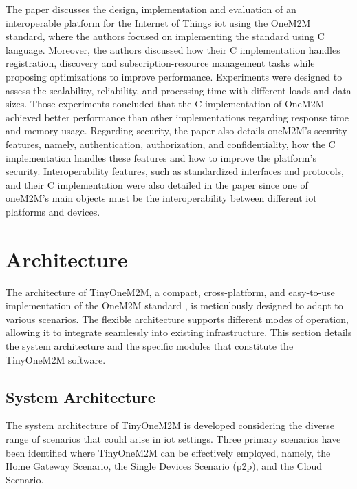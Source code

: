 \documentclass[a4paper,fleqn]{cas-dc}
\begin{document}
The paper \cite{Kim2018} discusses the design, implementation and evaluation of an interoperable platform for the Internet of Things \gls{iot} using the OneM2M standard, where the authors focused on implementing the standard using C language. Moreover, the authors discussed how their C implementation handles registration, discovery and subscription-resource management tasks while proposing optimizations to improve performance. Experiments were designed to assess the scalability, reliability, and processing time with different loads and data sizes. Those experiments concluded that the C implementation of OneM2M achieved better performance than other implementations regarding response time and memory usage. Regarding security, the paper also details oneM2M's security features, namely, authentication, authorization, and confidentiality, how the C implementation handles these features and how to improve the platform's security. Interoperability features, such as standardized interfaces and protocols, and their C implementation were also detailed in the paper since one of oneM2M's main objects must be the interoperability between different \gls{iot} platforms and devices.


\section{Architecture}
\label{architecture}

The architecture of TinyOneM2M, a compact, cross-plat\-form, and easy-to-use implementation of the OneM2M standard \cite{onem2m_standard}, is meticulously designed to adapt to various scenarios. The flexible architecture supports different modes of operation, allowing it to integrate seamlessly into existing infrastructure. This section details the system architecture and the specific modules that constitute the TinyOneM2M software.

\subsection{System Architecture}

The system architecture of TinyOneM2M is developed considering the diverse range of scenarios that could arise in \gls{iot} settings. Three primary scenarios have been identified where TinyOneM2M can be effectively employed, namely, the Home Gateway Scenario, the Single Devices Scenario (\gls{p2p}), and the Cloud Scenario.
\end{document}
